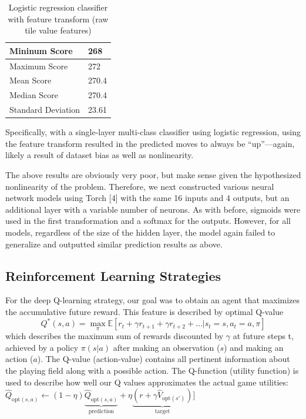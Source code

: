 \documentclass[9pt,twocolumn]{article}
\begin{document}
\begin{table}[!htbp]

\centering

\begin{tabular}{|l|l|}
\hline
Mininum Score      & 268 \\ \hline
Maximum Score      & 272 \\ \hline
Mean Score         & 270.4 \\ \hline
Median Score       & 270.4 \\ \hline
Standard Deviation & 23.61 \\ \hline
\end{tabular}

\caption{Logistic regression classifier with feature transform (raw tile value features)}

\end{table}

Specifically, with a single-layer multi-class classifier using logistic regression, using the feature transform resulted in the predicted moves to always be “up”---again, likely a result of dataset bias as well as nonlinearity.

The above results are obviously very poor, but make sense given the hypothesized nonlinearity of the problem. Therefore, we next constructed various neural network models using Torch [4] with the same 16 inputs and 4 outputs, but an additional layer with a variable number of neurons. As with before, sigmoids were used in the first transformation and a softmax for the outputs. However, for all models, regardless of the size of the hidden layer, the model again failed to generalize and outputted similar prediction results as above.

\subsection{Reinforcement Learning Strategies}

For the deep Q-learning strategy, our goal was to obtain an agent that maximizes the accumulative future reward. This feature is described by optimal Q-value
$$Q^*(s, a) = \max_{\pi} \mathbb{E} [r_t + \gamma r_{t + 1} + \gamma r_{t + 2} + \dots | s_t = s, a_t = a, \pi]$$
which describes the maximum sum of rewards discounted by $\gamma$ at future steps t, achieved by a policy $\pi(s|a)$ after making an observation ($s$) and making an action ($a$). The Q-value (action-value) contains all pertinent information about the playing field along with a possible action. The Q-function (utility function) is used to describe how well our Q values approximates the actual game utilities:
$\hat Q_{\text{opt}(s, a)} \leftarrow (1-\eta) \underbrace{\hat Q_{\text{opt}(s, a)}}_\text{prediction} + \eta \underbrace{(r + \gamma \hat V_{\text{opt}(s')})}_\text{target}]$
\end{document}
